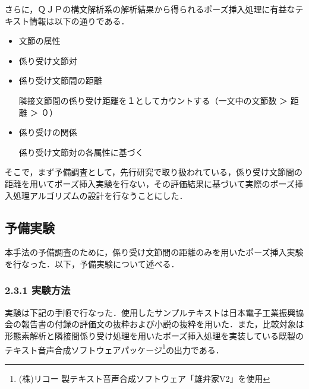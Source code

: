 \vspace{0.2cm}

さらに，ＱＪＰの構文解析系の解析結果から得られるポーズ挿入処理に有益なテキスト情報は以下の通りである．

\begin{itemize}

	\item 文節の属性

	\item 係り受け文節対

	\item 係り受け文節間の距離

		隣接文節間の係り受け距離を１としてカウントする（一文中の文節数 ＞ 距離 ＞ ０）

	\item 係り受けの関係

		係り受け文節対の各属性に基づく

\end{itemize}

\vspace{0.2cm}

そこで，まず予備調査として，先行研究\cite[など]{箱田1980,箱田1989}で取り扱われている，係り受け文節間の距離を用いてポーズ挿入実験を行ない，その評価結果に基づいて実際のポーズ挿入処理アルゴリズムの設計を行なうことにした．

\subsection{予備実験}

本手法の予備調査のために，係り受け文節間の距離のみを用いたポーズ挿入実験を行なった\cite{佐藤1997}．以下，予備実験について述べる．

\subsubsection{2.3.1 \hspace{5mm}実験方法}
\label{yobichosa}

実験は下記の手順で行なった．使用したサンプルテキストは日本電子工業振興協会の報告\mbox{書\cite{日本電子工業振興協会1995}の付録の}評価文の抜粋および小説\cite{村上1995}\mbox{の抜粋を用いた．}また，比較対象は形態素解析と隣接間係り受け処理を用いたポーズ挿入処理を実装している既製のテキスト音声合成ソフトウェアパッケージ\footnote{(株)リコー 製テキスト音声合成ソフトウェア「雄弁家V2」を使用}の出力である．

